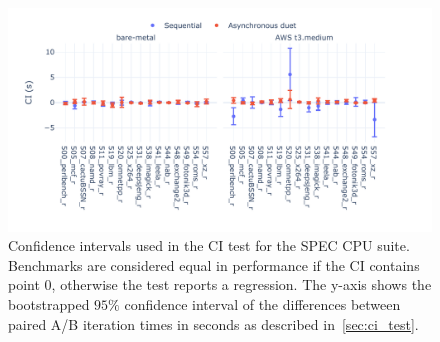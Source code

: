 \begin{figure}
	\centering
	\includegraphics[width=1\linewidth]{./figures/ci_example_benchmark.pdf}
	\caption{
		Confidence intervals used in the CI test for the SPEC CPU suite.
		Benchmarks are considered equal in performance if the CI contains point $0$, otherwise the test reports a regression.
		The \mbox{y-axis} shows the bootstrapped $95\%$ confidence interval of the differences between paired A/B iteration times in seconds as described in~\cref{sec:ci_test}.
	}
	\label{fig:ci_example}
\end{figure}
